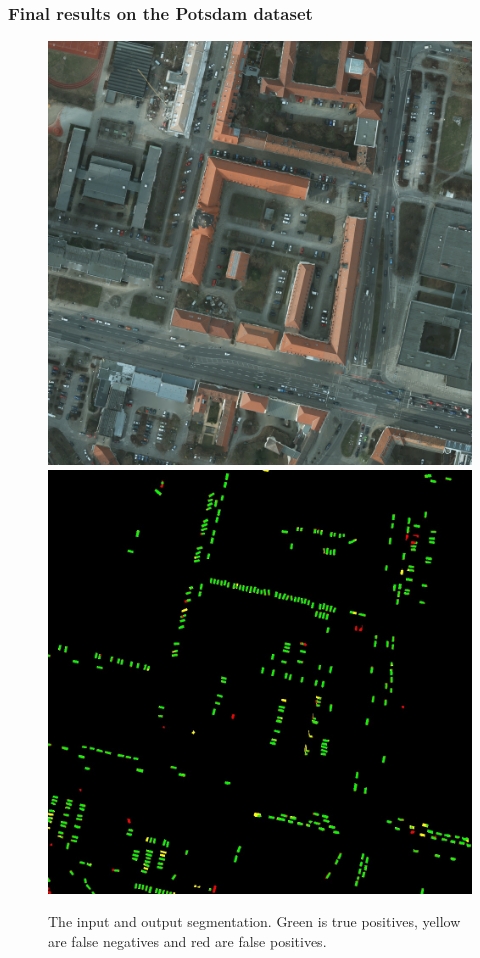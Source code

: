 \documentclass[aspectratio=1610]{beamer}
\begin{document}
\begin{frame}
  \frametitle{\hfill Final results on the Potsdam dataset}
\begin{figure}[H]
  \includegraphics[width=\linewidth]{input}
\endminipage\hfill
{}
  \includegraphics[width=\linewidth]{out}
\endminipage\hfill
\caption{The input and output segmentation. Green is true positives, yellow are false negatives and red are false positives.}
\end{figure}
\end{frame}
\end{document}
